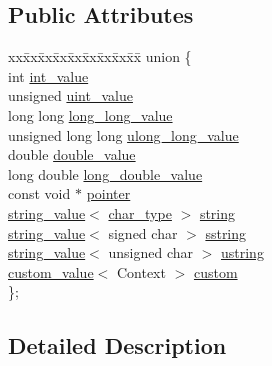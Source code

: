 \subsection*{Public Attributes}
\begin{DoxyCompactItemize}
\item 
\begin{tabbing}
xx\=xx\=xx\=xx\=xx\=xx\=xx\=xx\=xx\=\kill
union \{\\
\>int \hyperlink{classinternal_1_1value_a8e2b73ad5a9319e0b93bdb68467ba0b3}{int\_value}\\
\>unsigned \hyperlink{classinternal_1_1value_a95277a7bf9ae00baa4b670d169a2d462}{uint\_value}\\
\>long long \hyperlink{classinternal_1_1value_acac03c081ac2c8ab67f542f55e935789}{long\_long\_value}\\
\>unsigned long long \hyperlink{classinternal_1_1value_ab4e3bdcbd82033eff1ed026e93d8fbc2}{ulong\_long\_value}\\
\>double \hyperlink{classinternal_1_1value_a6a96bedffbc80c761fe5899f5859f2f0}{double\_value}\\
\>long double \hyperlink{classinternal_1_1value_a39ac0e75a8a16f2d50a032b242af7a54}{long\_double\_value}\\
\>const void $\ast$ \hyperlink{classinternal_1_1value_a9fa6472bcb2e3d35381324954b9f8838}{pointer}\\
\>\hyperlink{structinternal_1_1string__value}{string\_value}$<$ \hyperlink{classinternal_1_1value_aea7e71c59ab9961b645ed79e69aff80e}{char\_type} $>$ \hyperlink{classinternal_1_1value_a36bb89e179b0c0ad545faa47647bfdc3}{string}\\
\>\hyperlink{structinternal_1_1string__value}{string\_value}$<$ signed char $>$ \hyperlink{classinternal_1_1value_a6f59d2e71caf031b46adfd9bc3ab9383}{sstring}\\
\>\hyperlink{structinternal_1_1string__value}{string\_value}$<$ unsigned char $>$ \hyperlink{classinternal_1_1value_ae036559e2acba411ec237335f9c227d1}{ustring}\\
\>\hyperlink{structinternal_1_1custom__value}{custom\_value}$<$ Context $>$ \hyperlink{classinternal_1_1value_aa9a9cd49300dc090a73acf6757a98ff2}{custom}\\
\}; \\

\end{tabbing}\end{DoxyCompactItemize}


\subsection{Detailed Description}
